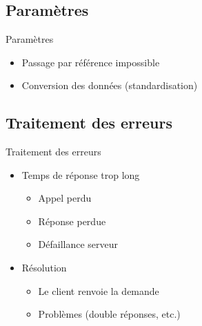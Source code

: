 \section{\sectitle}
\begin{frame}{\sectitle}
    \def\subsectitle{Paramètres}
    \subsection{\subsectitle}
    \begin{block}{\subsectitle}
        \begin{itemize}
            \item Passage par référence impossible
            \item Conversion des données (standardisation)
        \end{itemize}
    \end{block}
    \def\subsectitle{Traitement des erreurs}
    \subsection{\subsectitle}
    \begin{block}{\subsectitle}
        \begin{itemize}
            \item Temps de réponse trop long 
                \begin{itemize}
                    \item Appel perdu
                    \item Réponse perdue
                    \item Défaillance serveur
                \end{itemize}
            \item Résolution
                \begin{itemize}
                    \item Le client renvoie la demande
                    \item Problèmes (double réponses, etc.)
                \end{itemize}
        \end{itemize}
    \end{block}
\end{frame}


\def\sectitle{}
